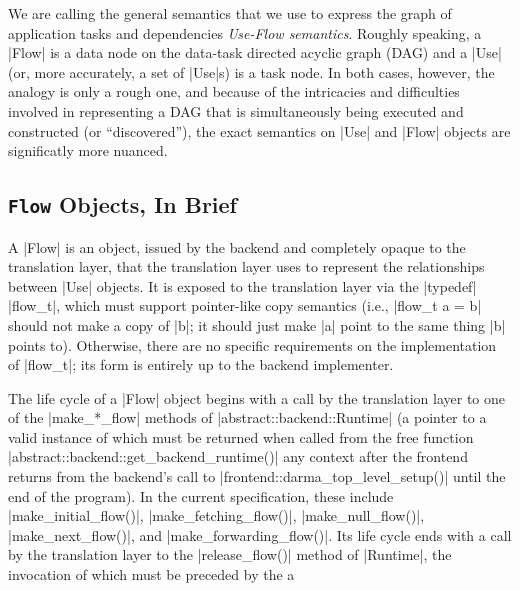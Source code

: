 We are calling the general semantics that we use to express the graph of application tasks and
dependencies {\it Use-Flow semantics}.  Roughly speaking, a |Flow| is a data node on the data-task
directed acyclic graph (DAG) and a |Use| (or, more accurately, a set of |Use|s) is a task node.  In
both cases, however, the analogy is only a rough one, and because of the intricacies and
difficulties involved in representing a DAG that is simultaneously being executed and constructed
(or ``discovered''), the exact semantics on |Use| and |Flow| objects are significatly more nuanced.

\subsection{{\tt Flow} Objects, In Brief}

A |Flow| is an object, issued by the backend and completely opaque to the translation layer, that
the translation layer uses to represent the relationships between |Use| objects.  It is exposed to
the translation layer via the |typedef| |flow_t|, which must support pointer-like copy semantics
(i.e., |flow_t a = b| should not make a copy of |b|; it should just make |a| point to the same
thing |b| points to).  Otherwise, there are no specific requirements on the implementation of
|flow_t|; its form is entirely up to the backend implementer.

The life cycle of a |Flow| object begins with a call by the translation layer to one of the
|make_*_flow| methods of |abstract::backend::Runtime| (a pointer to a valid instance of which must
be returned when called from the free function |abstract::backend::get_backend_runtime()| any
context after the frontend returns from the backend's call to |frontend::darma_top_level_setup()|
until the end of the program).  In the current specification, these
include |make_initial_flow()|, |make_fetching_flow()|, |make_null_flow()|, |make_next_flow()|,
and |make_forwarding_flow()|.  Its life cycle ends with a call by the translation layer to
the |release_flow()| method of |Runtime|, the invocation of which must be preceded by the 
a 

